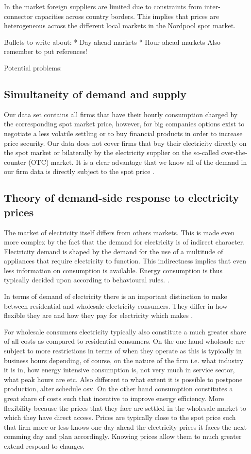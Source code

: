 In the market foreign suppliers are limited due to constraints from inter-connector capacities across country borders. This implies that prices are heterogeneous across the different local markets in the Nordpool spot market. 

Bullets to write about: 
* Day-ahead markets
* Hour ahead markets 
Also remember to put references! 

Potential problems: 


\subsection{Simultaneity of demand and supply}
\label{subsec:t_simultaneity}
Our data set contains all firms that have their hourly consumption charged by the corresponding spot market price, however, for big companies options exist to negotiate a less volatile settling or to buy financial products in order to increase price security. Our data does not cover firms that buy their electricity directly on the spot market or bilaterally by the electricity supplier on the so-called over-the-counter (OTC) market. It is a clear advantage that we know all of the demand in our firm data is directly subject to the spot price \citep{lijesen2007real}.


\subsection{Theory of demand-side response to electricity prices}
\label{subsec:t_demand}
The market of electricity itself differs from others markets. This is made even more complex by the fact that the demand for electricity is of indirect character. Electricity demand is shaped by the demand for the use of a multitude of appliances that require electricity to function. This indirectness implies that even less information on consumption is available. Energy consumption is thus typically decided upon according to behavioural rules. \citep{kirschen2003demand}. 

In terms of demand of electricity there is an important distinction to make between residential and wholesale electricity consumers. They differ in how flexible they are and how they pay for electricity which makes , 

For wholesale consumers electricity typically also constitute a much greater share of all costs as compared to residential consumers. 
On the one hand wholesale are subject to more restrictions in terms of when they operate as this is typically in business hours depending, of course, on the nature of the firm i.e. what industry it is in, how energy intensive consumption is, not very much in service sector, what peak hours are etc. Also different to what extent it is possible to postpone production, alter schedule osv. On the other hand consumption constitutes a great share of costs such that incentive to improve energy efficiency. More flexibility because the prices that they face are settled in the wholesale market to which they have direct access. Prices are typically close to the spot price such that firm more or less knows one day ahead the electricity prices it faces the next comming day and plan accordingly. Knowing prices allow them to much greater extend respond to changes. 

